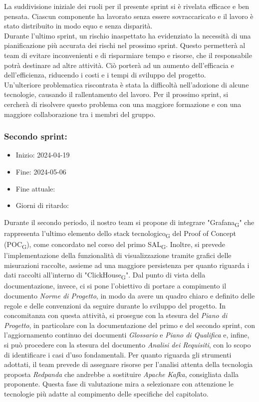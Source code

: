         La suddivisione iniziale dei ruoli per il presente sprint si è rivelata efficace e ben pensata. Ciascun componente ha lavorato senza essere sovraccaricato e il lavoro è stato distribuito in modo equo e senza disparità.\\
        Durante l’ultimo sprint, un rischio inaspettato ha evidenziato la necessità di una pianificazione più accurata dei rischi nel prossimo sprint. Questo permetterà al team di evitare inconvenienti e di risparmiare tempo e risorse, che il responsabile potrà destinare ad altre attività. Ciò porterà ad un aumento dell’efficacia e dell’efficienza, riducendo i costi e i tempi di sviluppo del progetto.\\
        Un'ulteriore problematica riscontrata è stata la difficoltà nell'adozione di alcune tecnologie, causando il rallentamento del lavoro. Per il prossimo sprint, si cercherà di risolvere questo problema con una maggiore formazione e con una maggiore collaborazione tra i membri del gruppo.\\
    \subsubsection{Secondo sprint:}
    \begin{itemize}
        \item Inizio: 2024-04-19
        \item Fine: 2024-05-06
        \item Fine attuale:
        \item Giorni di ritardo:
    \end{itemize}
    Durante il secondo periodo, il nostro team si propone di integrare "{Grafana\textsubscript{G}}" che rappresenta l'ultimo elemento dello 
    {stack tecnologico\textsubscript{G}} del Proof of Concept ({POC\textsubscript{G}}), come concordato nel corso del primo {SAL\textsubscript{G}}.
    Inoltre, si prevede l'implementazione della funzionalità di visualizzazione tramite grafici delle misurazioni raccolte,
    assieme ad una maggiore persistenza per quanto riguarda i dati raccolti all'interno di "{ClickHouse\textsubscript{G}}".
    Dal punto di vista della documentazione, invece, ci si pone l'obiettivo di portare a compimento il documento \textit{Norme di Progetto},
    in modo da avere un quadro chiaro e definito delle regole e delle convenzioni da seguire durante lo sviluppo del progetto.
    In concomitanza con questa attività, si prosegue con la stesura del \textit{Piano di Progetto}, in particolare con la documentazione del primo
    e del secondo sprint, con l'aggiornamento continuo dei documenti \textit{Glossario} e \textit{Piano di Qualifica} e, infine,
    si può procedere con la stesura del documento \textit{Analisi dei Requisiti}, con lo scopo di identificare i casi d'uso fondamentali.
    Per quanto riguarda gli strumenti adottati, il team prevede di assegnare risorse per l'analisi attenta della tecnologia proposta \textit{Redpanda}
    che andrebbe a sostituire \textit{Apache Kafka}, consigliata dalla proponente. Questa fase di valutazione mira a selezionare con attenzione
    le tecnologie più adatte al compimento delle specifiche del capitolato.

